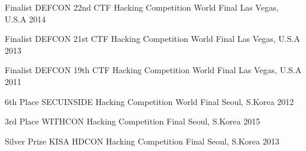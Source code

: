 

\begin{cvhonors}

  \cvhonor
    {Finalist} %
    {DEFCON 22nd CTF Hacking Competition World Final} %
    {Las Vegas, U.S.A} %
    {2014} %

  \cvhonor
    {Finalist} %
    {DEFCON 21st CTF Hacking Competition World Final} %
    {Las Vegas, U.S.A} %
    {2013} %

  \cvhonor
    {Finalist} %
    {DEFCON 19th CTF Hacking Competition World Final} %
    {Las Vegas, U.S.A} %
    {2011} %

  \cvhonor
    {6th Place} %
    {SECUINSIDE Hacking Competition World Final} %
    {Seoul, S.Korea} %
    {2012} %

\end{cvhonors}




\begin{cvhonors}

  \cvhonor
    {3rd Place} %
    {WITHCON Hacking Competition Final} %
    {Seoul, S.Korea} %
    {2015} %

  \cvhonor
    {Silver Prize} %
    {KISA HDCON Hacking Competition Final} %
    {Seoul, S.Korea} %
    {2013} %

\end{cvhonors}


